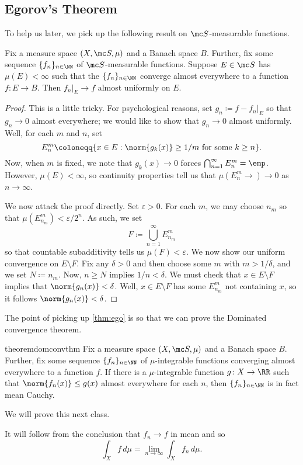 \documentclass[../notes.tex]{subfiles}
\begin{document}
\subsection{Egorov's Theorem}
To help us later, we pick up the following result on $\mc S$-measurable functions.
\begin{theorem}[Egorov's] \label{thm:ego}
	Fix a measure space $(X,\mc S,\mu)$ and a Banach space $B$. Further, fix some sequence $\{f_n\}_{n\in\NN}$ of $\mc S$-measurable functions. Suppose $E\in\mc S$ has $\mu(E)<\infty$ such that the $\{f_n\}_{n\in\NN}$ converge almost everywhere to a function $f\colon E\to B$. Then $f_n|_E\to f$ almost uniformly on $E$.
\end{theorem}
\begin{proof}
	This is a little tricky. For psychological reasons, set $g_n\coloneqq f-f_n|_E$ so that $g_n\to0$ almost everywhere; we would like to show that $g_n\to0$ almost uniformly. Well, for each $m$ and $n$, set
	\[E^m_n\coloneqq\{x\in E:\norm{g_k(x)}\ge1/m\text{ for some }k\ge n\}.\]
	Now, when $m$ is fixed, we note that $g_k(x)\to0$ forces $\bigcap_{n=1}^\infty E^m_n=\emp$. However, $\mu(E)<\infty$, so continuity properties tell us that $\mu\left(E^m_n\to\right)\to0$ as $n\to\infty$. 

	We now attack the proof directly. Set $\varepsilon>0$. For each $m$, we may choose $n_m$ so that $\mu\left(E^m_{n_m}\right)<\varepsilon/2^n$. As such, we set
	\[F\coloneqq\bigcup_{n=1}^\infty E^m_{n_m}\]
	so that countable subadditivity tells us $\mu(F)<\varepsilon$. We now show our uniform convergence on $E\setminus F$. Fix any $\delta>0$ and then choose some $m$ with $m>1/\delta$, and we set $N\coloneqq n_m$. Now, $n\ge N$ implies $1/n<\delta$. We must check that $x\in E\setminus F$ implies that $\norm{g_n(x)}<\delta$. Well, $x\in E\setminus F$ has some $E^{m}_{n_m}$ not containing $x$, so it follows $\norm{g_n(x)}<\delta$.
\end{proof}
The point of picking up \autoref{thm:ego} is so that we can prove the Dominated convergence theorem.
\begin{restatable}{theorem}{domconvthm} \label{thm:dom-conv}
	Fix a measure space $(X,\mc S,\mu)$ and a Banach space $B$. Further, fix some sequence $\{f_n\}_{n\in\NN}$ of $\mu$-integrable functions converging almost everywhere to a function $f$. If there is a $\mu$-integrable function $g\colon X\to\RR$ such that $\norm{f_n(x)}\le g(x)$ almost everywhere for each $n$, then $\{f_n\}_{n\in\NN}$ is in fact mean Cauchy.
\end{restatable}
\noindent We will prove this next class.
\begin{remark}
	It will follow from the conclusion that $f_n\to f$ in mean and so
	\[\int_Xf\,d\mu=\lim_{n\to\infty}\int_Xf_n\,d\mu.\]
\end{remark}
\end{document}
